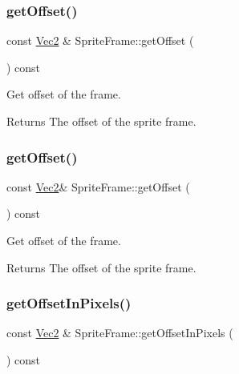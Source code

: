 \subsubsection{\texorpdfstring{get\+Offset()}{getOffset()}\hspace{0.1cm}{\footnotesize\ttfamily [1/2]}}
{\footnotesize\ttfamily const \hyperlink{classVec2}{Vec2} \& Sprite\+Frame\+::get\+Offset (\begin{DoxyParamCaption}{ }\end{DoxyParamCaption}) const}

Get offset of the frame.

\begin{DoxyReturn}{Returns}
The offset of the sprite frame. 
\end{DoxyReturn}
\mbox{\label{classSpriteFrame_ae0684b6949155845e801e7807045a585}} 
\subsubsection{\texorpdfstring{get\+Offset()}{getOffset()}\hspace{0.1cm}{\footnotesize\ttfamily [2/2]}}
{\footnotesize\ttfamily const \hyperlink{classVec2}{Vec2}\& Sprite\+Frame\+::get\+Offset (\begin{DoxyParamCaption}{ }\end{DoxyParamCaption}) const}

Get offset of the frame.

\begin{DoxyReturn}{Returns}
The offset of the sprite frame. 
\end{DoxyReturn}
\mbox{\label{classSpriteFrame_ad7c8997479c5360667a9369bf61f16d7}} 
\subsubsection{\texorpdfstring{get\+Offset\+In\+Pixels()}{getOffsetInPixels()}\hspace{0.1cm}{\footnotesize\ttfamily [1/2]}}
{\footnotesize\ttfamily const \hyperlink{classVec2}{Vec2} \& Sprite\+Frame\+::get\+Offset\+In\+Pixels (\begin{DoxyParamCaption}{ }\end{DoxyParamCaption}) const}


